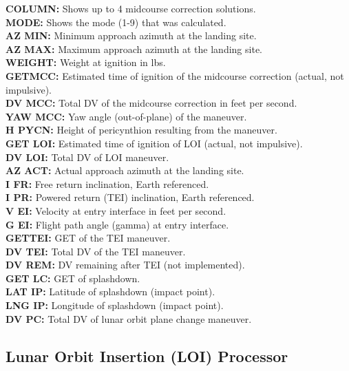 \documentclass[11pt]{article} %
\begin{document}
\textbf{COLUMN:} Shows up to 4 midcourse correction solutions.\\
\textbf{MODE:} Shows the mode (1-9) that was calculated.\\
\textbf{AZ MIN:} Minimum approach azimuth at the landing site.\\
\textbf{AZ MAX:} Maximum approach azimuth at the landing site.\\
\textbf{WEIGHT:} Weight at ignition in lbs.\\
\textbf{GETMCC:} Estimated time of ignition of the midcourse correction (actual, not impulsive).\\
\textbf{DV MCC:} Total DV of the midcourse correction in feet per second.\\
\textbf{YAW MCC:} Yaw angle (out-of-plane) of the maneuver.\\
\textbf{H PYCN:} Height of pericynthion resulting from the maneuver.\\
\textbf{GET LOI:} Estimated time of ignition of LOI (actual, not impulsive).\\
\textbf{DV LOI:} Total DV of LOI maneuver.\\
\textbf{AZ ACT:} Actual approach azimuth at the landing site.\\
\textbf{I FR:} Free return inclination, Earth referenced.\\
\textbf{I PR:} Powered return (TEI) inclination, Earth referenced.\\
\textbf{V EI:} Velocity at entry interface in feet per second.\\
\textbf{G EI:} Flight path angle (gamma) at entry interface.\\
\textbf{GETTEI:} GET of the TEI maneuver.\\
\textbf{DV TEI:} Total DV of the TEI maneuver.\\
\textbf{DV REM:} DV remaining after TEI (not implemented).\\
\textbf{GET LC:} GET of splashdown.\\
\textbf{LAT IP:} Latitude of splashdown (impact point).\\
\textbf{LNG IP:} Longitude of splashdown (impact point).\\
\textbf{DV PC:} Total DV of lunar orbit plane change maneuver.\\
\newpage
\subsection{Lunar Orbit Insertion (LOI) Processor}
\end{document}
